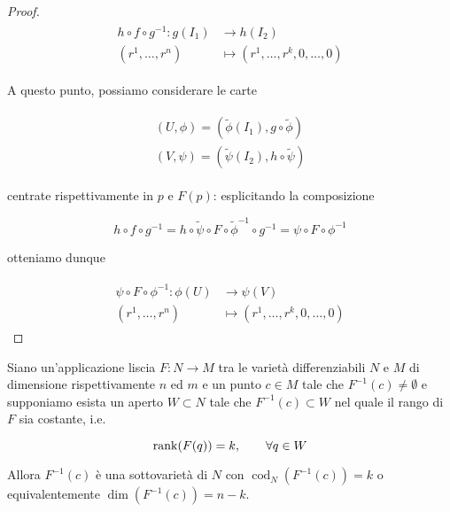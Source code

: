 \begin{proof}
	\begin{align}
		\begin{split}
			h \circ f \circ g^{-1} : g(I_{1}) &\to h(I_{2})\\
			(r^{1},\dots,r^{n}) &\mapsto (r^{1},\dots,r^{k},0,\dots,0)
		\end{split}
	\end{align}

	A questo punto, possiamo considerare le carte
	
	\begin{align}
		\begin{split}
			(U,\phi) = (\tilde{\phi}(I_{1}),g \circ \tilde{\phi})\\
			(V,\psi) = (\tilde{\psi}(I_{2}),h \circ \tilde{\psi})
		\end{split}
	\end{align}

	centrate rispettivamente in $ p $ e $ F(p) $: esplicitando la composizione
	
	\begin{equation}
		h \circ f \circ g^{-1} = h \circ \tilde{\psi} \circ F \circ \tilde{\phi}^{-1} \circ g^{-1} = \psi \circ F \circ \phi^{-1}
	\end{equation}

	otteniamo dunque
	
	\begin{align}
		\begin{split}
			\psi \circ F \circ \phi^{-1} : \phi(U) &\to \psi(V)\\
			(r^{1},\dots,r^{n}) &\mapsto (r^{1},\dots,r^{k},0,\dots,0)
		\end{split}
	\end{align}
\end{proof}

\begin{theorem}
	Siano un'applicazione liscia $ F : N \to M $ tra le varietà differenziabili $ N $ e $ M $ di dimensione rispettivamente $ n $ ed $ m $ e un punto $ c \in M $ tale che $ F^{-1}(c) \neq \emptyset $ e supponiamo esista un aperto $ W \subset N $ tale che $ F^{-1}(c) \subset W $ nel quale il rango di $ F $ sia costante, i.e.
	
	\begin{equation}
		\rank(F(q))=k, \qquad \forall q \in W
	\end{equation}

	Allora $ F^{-1}(c) $ è una sottovarietà di $ N $ con $ \operatorname{cod}_{N}(F^{-1}(c)) = k $ o equivalentemente $ \dim(F^{-1}(c)) = n-k $.
\end{theorem}

